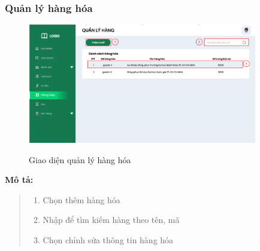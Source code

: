     \subsubsection{Quản lý hàng hóa}
        \begin{figure}[!htp]
            \centering
            \includegraphics[width=10cm]{img/UI/admin/Goods.png}
            \label{37}
            \newline
            \caption{Giao diện quản lý hàng hóa}
        \end{figure}
        \textbf{Mô tả:}  
        \begin{quote}
            \begin{enumerate}
                \item Chọn thêm hàng hóa
                \item Nhập để tìm kiếm hàng theo tên, mã
                \item Chọn chỉnh sửa thông tin hàng hóa
            \end{enumerate}
        \end{quote}
        
